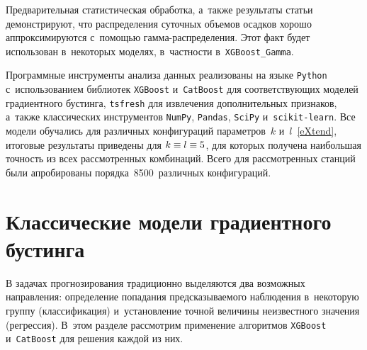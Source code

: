 \begin{multicols}{2}
{ }

Предварительная статистическая обработка, а~так\-же результаты 
статьи~\cite{Gorshenin2018a} демонстрируют, что распределения суточных 
объемов осадков хорошо аппроксимируются с~помощью гам\-ма-рас\-пре\-де\-ле\-ния. 
Этот факт будет использован в~некоторых моделях, в~частности в~\verb"XGBoost_Gamma". 

Программные инструменты анализа данных реализованы на языке \verb"Python" 
с~использованием биб\-лио\-тек \verb"XGBoost" и~\verb"CatBoost" для со\-от\-вет\-ст\-ву\-ющих 
моделей градиентного бустинга, \verb"tsfresh" для извлечения дополнительных 
признаков, а~так\-же классических инструментов \verb"NumPy", \verb"Pandas", 
\verb"SciPy" и~\verb"scikit-learn". Все модели обучались для различных 
конфигураций па\-ра\-мет\-ров~$k$ и~$l$~\eqref{eXtend}, итоговые результаты приведены 
для $k \hm\equiv l \hm \equiv 5$, для которых получена наибольшая точность 
из всех рассмотренных комбинаций. Всего для рассмотренных станций были 
апробированы порядка~8500~различных конфигураций.

\section{Классические модели градиентного бустинга}

В задачах прогнозирования традиционно выделяются два возможных 
направления: определение попадания предсказываемого наблюдения в~некоторую 
группу (классификация) и~установление точной величины неизвестного значения 
(регрессия). В~этом разделе рассмотрим применение алгоритмов \verb"XGBoost" 
и~\verb"CatBoost" для решения каждой из них.

\setcounter{table}{2}
\begin{table*}[b]\small %
\begin{center}
\vspace*{2ex}


\end{center}
\end{table*}
\end{multicols}
